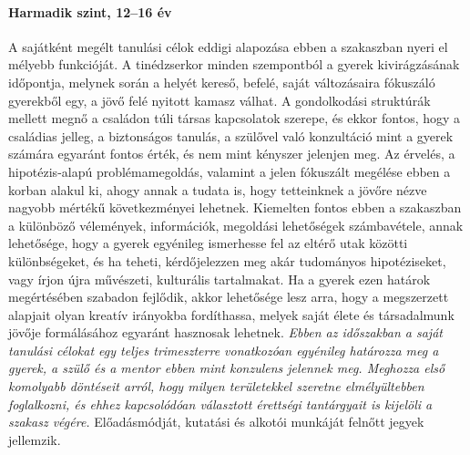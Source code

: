 \paragraph{Harmadik szint, 12--16 év}

A sajátként megélt tanulási célok eddigi alapozása ebben a szakaszban nyeri el mélyebb funkcióját. A tinédzserkor minden szempontból a gyerek kivirágzásának időpontja, melynek során a helyét kereső, befelé, saját változásaira fókuszáló gyerekből egy, a jövő felé nyitott kamasz válhat. A gondolkodási struktúrák mellett megnő a családon túli társas kapcsolatok szerepe, és ekkor fontos, hogy a családias jelleg, a biztonságos tanulás, a szülővel való konzultáció mint a gyerek számára egyaránt fontos érték, és nem mint kényszer jelenjen meg. Az érvelés, a hipotézis-alapú problémamegoldás, valamint a jelen fókuszált megélése ebben a korban alakul ki, ahogy annak a tudata is, hogy tetteinknek a jövőre nézve nagyobb mértékű következményei lehetnek. Kiemelten fontos ebben a szakaszban a különböző vélemények, információk, megoldási lehetőségek számba\-vétele, annak lehetősége, hogy a gyerek egyénileg ismerhesse fel az eltérő utak közötti különbségeket, és ha teheti, kérdőjelezzen meg akár tudományos hipotéziseket, vagy írjon újra művészeti, kulturális tartalmakat.
Ha a gyerek ezen határok megértésében szabadon fejlődik, akkor lehetősége lesz arra, hogy a megszerzett alapjait olyan kreatív irányokba fordíthassa, melyek saját élete és társadalmunk jövője formálásához egyaránt hasznosak lehetnek. \emph{Ebben az időszakban a saját tanulási célokat egy teljes trimeszterre vonatkozóan egyénileg határozza meg a gyerek, a szülő és a mentor ebben mint konzulens jelennek meg. Meghozza első komolyabb döntéseit arról, hogy milyen területekkel szeretne elmélyültebben foglalkozni, és ehhez kapcsolódóan választott érettségi tantárgyait is kijelöli a szakasz végére.} Előadásmódját, kutatási és alkotói munkáját felnőtt jegyek jellemzik.

